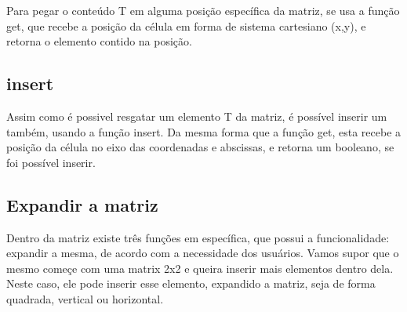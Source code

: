 \documentclass[12pt]{article}
\begin{document}
  Para pegar o conteúdo T em alguma posição específica da matriz, se usa 
  a função get, que recebe a posição da célula em forma de sistema cartesiano
  (x,y), e retorna o elemento contido na posição.

  \subsection{insert} 

  Assim como é possivel resgatar um elemento T da matriz, é possível inserir
  um também, usando a função insert. Da mesma forma que a função get, esta 
  recebe a posição da célula no eixo das coordenadas e abscissas, e retorna
  um booleano, se foi possível inserir. 

  \subsection{Expandir a matriz}

  Dentro da matriz existe três funções em específica, que possui a funcionalidade:
  expandir a mesma, de acordo com a necessidade dos usuários. Vamos supor que o mesmo
  começe com uma matrix 2x2 e queira inserir mais elementos dentro dela. Neste
  caso, ele pode inserir esse elemento, expandido a matriz, seja de forma quadrada,
  vertical ou horizontal.
\end{document}
